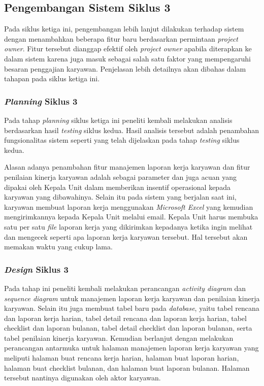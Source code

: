 	\subsection{Pengembangan Sistem Siklus 3}
	Pada siklus ketiga ini, pengembangan lebih lanjut dilakukan terhadap sistem dengan menambahkan beberapa fitur baru berdasarkan permintaan \emph{project owner}. Fitur tersebut dianggap efektif oleh \emph{project owner} apabila diterapkan ke dalam sistem karena juga masuk sebagai salah satu faktor yang mempengaruhi besaran penggajian karyawan. Penjelasan lebih detailnya akan dibahas dalam tahapan pada siklus ketiga ini.
	
	\subsubsection{\emph{Planning} Siklus 3}
	Pada tahap \emph{planning} siklus ketiga ini peneliti kembali melakukan analisis berdasarkan hasil \emph{testing} siklus kedua. Hasil analisis tersebut adalah penambahan fungsionalitas sistem seperti yang telah dijelaskan pada tahap \emph{testing} siklus kedua.
	
	Alasan adanya penambahan fitur manajemen laporan kerja karyawan dan fitur penilaian kinerja karyawan adalah sebagai parameter dan juga acuan yang dipakai oleh Kepala Unit dalam memberikan insentif operasional kepada karyawan yang dibawahinya. Selain itu pada sistem yang berjalan saat ini, karyawan membuat laporan kerja menggunakan \emph{Microsoft Excel} yang kemudian mengirimkannya kepada Kepala Unit melalui email. Kepala Unit harus membuka satu per satu \emph{file} laporan kerja yang dikirimkan kepadanya ketika ingin melihat dan mengecek seperti apa laporan kerja karyawan tersebut. Hal tersebut akan memakan waktu yang cukup lama.
	
	\subsubsection{\emph{Design} Siklus 3}
	Pada tahap ini peneliti kembali melakukan perancangan \emph{activity diagram} dan \emph{sequence diagram} untuk manajemen laporan kerja karyawan dan penilaian kinerja karyawan. Selain itu juga membuat tabel baru pada \emph{database}, yaitu tabel rencana dan laporan kerja harian, tabel detail rencana dan laporan kerja harian, tabel checklist dan laporan bulanan, tabel detail checklist dan laporan bulanan, serta tabel penilaian kinerja karyawan. Kemudian berlanjut dengan melakukan perancangan antarmuka untuk halaman manajemen laporan kerja karyawan yang meliputi halaman buat rencana kerja harian, halaman buat laporan harian, halaman buat checklist bulanan, dan halaman buat laporan bulanan. Halaman tersebut nantinya digunakan oleh aktor karyawan.
	
